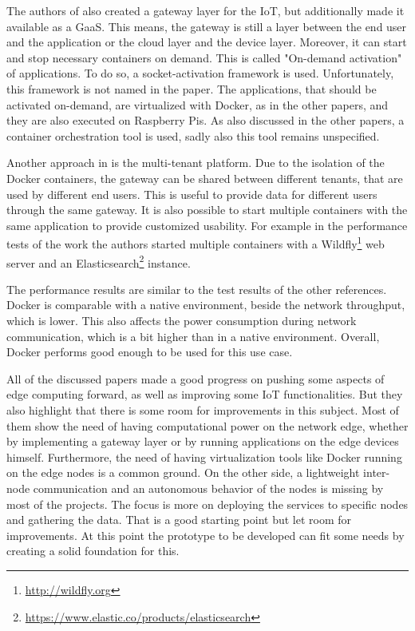 The authors of \autocite{Morabito:2016} also created a gateway layer for the \ac{IoT}, but additionally made it available as a \ac{GaaS}.
This means, the gateway is still a layer between the end user and the application or the cloud layer and the device layer.
Moreover, it can start and stop necessary containers on demand.
This is called "On-demand activation" of applications.\autocite[cf.][p. 3]{Morabito:2016}
To do so, a socket-activation framework is used.\autocite[cf.][p. 3]{Morabito:2016}
Unfortunately, this framework is not named in the paper.
The applications, that should be activated on-demand, are virtualized with Docker, as in the other papers, and they are also executed on Raspberry Pis.
As also discussed in the other papers, a container orchestration tool is used, sadly also this tool remains unspecified.

Another approach in \autocite{Morabito:2016} is the multi-tenant platform.
Due to the isolation of the Docker containers, the gateway can be shared between different tenants, that are used by different end users.\autocite[cf.][p. 2]{Morabito:2016}
This is useful to provide data for different users through the same gateway.
It is also possible to start multiple containers with the same application to provide customized usability.
For example in the performance tests of the work the authors started multiple containers with a Wildfly\footnote{\url{http://wildfly.org}} web server and an Elasticsearch\footnote{\url{https://www.elastic.co/products/elasticsearch}} instance.\autocite[cf.][p. 2]{Morabito:2016}

The performance results are similar to the test results of the other references.
Docker is comparable with a native environment, beside the network throughput, which is lower.\autocite[cf.][p. 4]{Morabito:2016}
This also affects the power consumption during network communication, which is a bit higher than in a native environment.\autocite[cf.][p. 4]{Morabito:2016}
Overall, Docker performs good enough to be used for this use case.\autocite[cf.][p. 4]{Morabito:2016}

All of the discussed papers made a good progress on pushing some aspects of edge computing forward, as well as improving some \ac{IoT} functionalities.
But they also highlight that there is some room for improvements in this subject.
Most of them show the need of having computational power on the network edge, whether by implementing a gateway layer or by running applications on the edge devices himself.
Furthermore, the need of having virtualization tools like Docker running on the edge nodes is a common ground.
On the other side, a lightweight inter-node communication and an autonomous behavior of the nodes is missing by most of the projects.
The focus is more on deploying the services to specific nodes and gathering the data.
That is a good starting point but let room for improvements.
At this point the prototype to be developed can fit some needs by creating a solid foundation for this.
